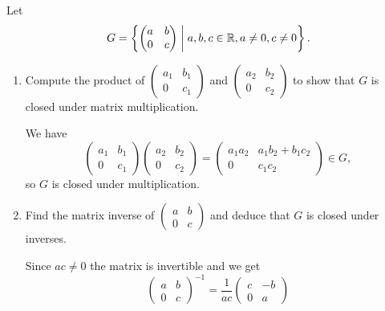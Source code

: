 Let
\begin{equation*}
  G = \left\{
    \begin{pmatrix}
      a & b \\
      0 & c
    \end{pmatrix}
    \;\middle|\;
    a,b,c\in\mathbb{R}, a\neq0, c\neq0\right\}.
\end{equation*}
\begin{enumerate}
\item Compute the product of
  $\begin{pmatrix} a_1 & b_1 \\ 0 & c_1 \end{pmatrix}$ and
  $\begin{pmatrix} a_2 & b_2 \\ 0 & c_2 \end{pmatrix}$ to show that
  $G$ is closed under matrix multiplication.
  \begin{solution}
    We have
    \begin{equation*}
      \begin{pmatrix} a_1 & b_1 \\ 0 & c_1 \end{pmatrix}
      \begin{pmatrix} a_2 & b_2 \\ 0 & c_2 \end{pmatrix}
      =
      \begin{pmatrix}
        a_1a_2 & a_1b_2 + b_1c_2 \\
        0 & c_1c_2
      \end{pmatrix} \in G,
    \end{equation*}
    so $G$ is closed under multiplication.
  \end{solution}
\item Find the matrix inverse of
  $\begin{pmatrix} a & b \\ 0 & c \end{pmatrix}$ and deduce that $G$
  is closed under inverses.
  \begin{solution}
    Since $ac\neq0$ the matrix is invertible and we get
    \begin{equation*}
      \begin{pmatrix}
        a & b \\ 0 & c
      \end{pmatrix}^{-1}
      = \frac1{ac}
      \begin{pmatrix}
        c & -b \\ 0 & a

\end{pmatrix}
\end{equation*}
\end{solution}
\end{enumerate}
